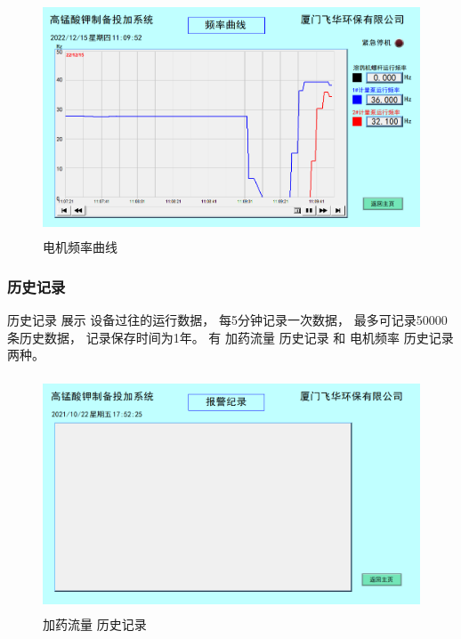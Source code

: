 \documentclass[UTF8,a4paper,12pt,titlepage]{ctexart}
\begin{document}
            \begin{figure}[h]
                \centering
                \includegraphics[height=7cm]{g10.PNG}
                \caption{电机频率曲线}\label{fig:p15}
            \end{figure}

        \subsubsection{历史记录}
            历史记录 展示 设备过往的运行数据，
            每5分钟记录一次数据，
            最多可记录50000条历史数据，
            记录保存时间为1年。
             有 加药流量 历史记录 和 电机频率 历史记录 两种。

            \begin{figure}[h]
                \centering
                \includegraphics[height=7cm]{g12.PNG}
                \caption{加药流量 历史记录}\label{fig:p16}
            \end{figure}

            \newpage
\end{document}
